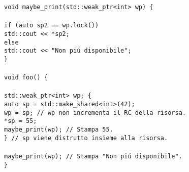 \documentclass{article}
\newcommand\tab[1][1cm]{\hspace*{#1}}
\begin{document}
\begin{itemize}
\texttt{void maybe\_print(std::weak\_ptr<int> wp) \{ \\ \\ \tab if (auto sp2 == wp.lock()) \\ \tab \tab std::cout << *sp2; \\ \tab else \\ \tab \tab std::cout << "Non pi\'u disponibile"; \\ \} \\ \\ void foo() \{ \\ \\ \tab std::weak\_ptr<int> wp; \{ \\ \tab \tab auto sp = std::make\_shared<int>(42); \\ \tab \tab wp = sp; \textcolor{grigio}{// wp non incrementa il RC della risorsa.} \\ \tab \tab *sp = 55; \\ \tab \tab maybe\_print(wp); \textcolor{grigio}{// Stampa 55.} \\ \tab \} \textcolor{grigio}{// sp viene distrutto insieme alla risorsa.} \\ \\ \tab maybe\_print(wp); \textcolor{grigio}{// Stampa "Non pi\'u disponibile".} \\ \} }
\end{itemize}
\end{document}
